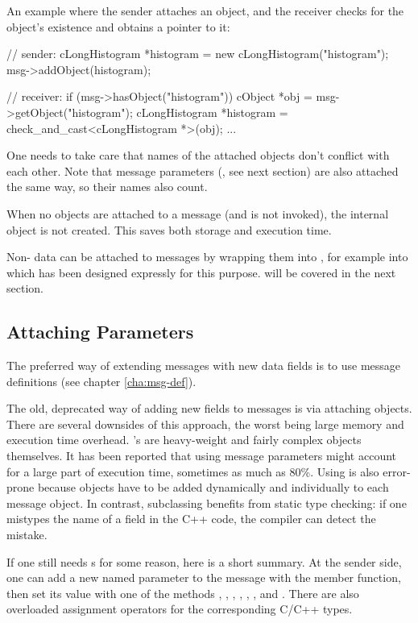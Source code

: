 An example where the sender attaches an object, and the receiver
checks for the object's existence and obtains a pointer to it:

\begin{cpp}
// sender:
cLongHistogram *histogram = new cLongHistogram("histogram");
msg->addObject(histogram);

// receiver:
if (msg->hasObject("histogram")) {
   cObject *obj = msg->getObject("histogram");
   cLongHistogram *histogram = check_and_cast<cLongHistogram *>(obj);
   ...
}
\end{cpp}

One needs to take care that names of the attached objects don't
conflict with each other. Note that message parameters (,
see next section) are also attached the same way, so their names
also count.

When no objects are attached to a message (and  is not
invoked), the internal  object is not created.
This saves both storage and execution time.

Non- data can be attached to messages by wrapping them into
, for example into  which has been designed
expressly for this purpose.  will be covered in the next
section.

\subsection{Attaching Parameters}
\label{sec:messages:attaching-parameters}

The preferred way of extending messages with new data fields is to use
message definitions (see chapter \ref{cha:msg-def}).

The old, deprecated way of adding new fields to messages is via
attaching  objects.
There are several downsides of this approach, the worst being
large memory and execution time overhead. 's are
heavy-weight and fairly complex objects themselves.
It has been reported that using  message parameters
might account for a large part of execution time, sometimes as much as 80\%.
Using  is also error-prone because  objects
have to be added dynamically and individually to each message object.
In contrast, subclassing benefits from static type checking:
if one mistypes the name of a field in the C++ code, the compiler
can detect the mistake.

If one still needs s for some reason, here is a short summary.
At the sender side, one can add a new named parameter to the message
with the  member function, then set its value with
one of the methods , ,
, , ,
, and . There are also overloaded
assignment operators for the corresponding C/C++ types.

